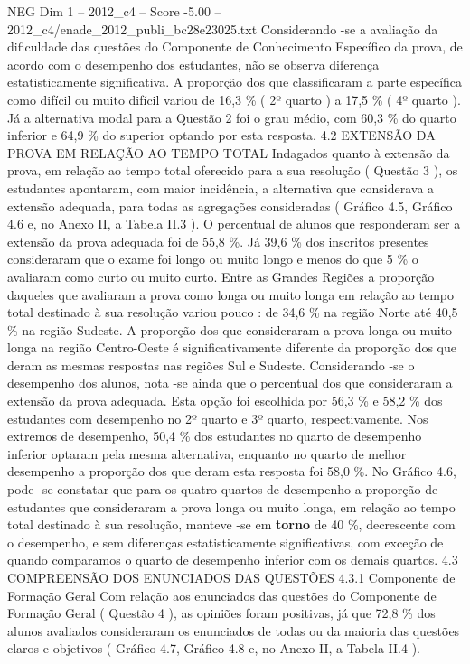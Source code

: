 \begin{textsample}{NEG Dim 1 – 2012\_c4 – Score -5.00 – 2012\_c4/enade\_2012\_publi\_bc28e23025.txt}
Considerando -se a avaliação da dificuldade das questões do Componente de Conhecimento Específico da prova, de acordo com o desempenho dos estudantes, não se observa diferença estatisticamente significativa.
A proporção dos que classificaram a parte específica como difícil ou muito difícil variou de 16,3 \% ( 2º quarto ) a 17,5 \% ( 4º quarto ).
Já a alternativa modal para a Questão 2 foi o grau médio, com 60,3 \% do quarto inferior e 64,9 \% do superior optando por esta resposta. 4.2 EXTENSÃO DA PROVA EM RELAÇÃO AO TEMPO TOTAL Indagados quanto à extensão da prova, em relação ao tempo total oferecido para a sua resolução ( Questão 3 ), os estudantes apontaram, com maior incidência, a alternativa que considerava a extensão adequada, para todas as agregações consideradas ( Gráfico 4.5, Gráfico 4.6 e, no Anexo II, a Tabela II.3 ).
O percentual de alunos que responderam ser a extensão da prova adequada foi de 55,8 \%.
Já 39,6 \% dos inscritos presentes consideraram que o exame foi longo ou muito longo e menos do que 5 \% o avaliaram como curto ou muito curto.
Entre as Grandes Regiões a proporção daqueles que avaliaram a prova como longa ou muito longa em relação ao tempo total destinado à sua resolução variou pouco : de 34,6 \% na região Norte até 40,5 \% na região Sudeste.
A proporção dos que consideraram a prova longa ou muito longa na região Centro-Oeste é significativamente diferente da proporção dos que deram as mesmas respostas nas regiões Sul e Sudeste.
Considerando -se o desempenho dos alunos, nota -se ainda que o percentual dos que consideraram a extensão da prova adequada.
Esta opção foi escolhida por 56,3 \% e 58,2 \% dos estudantes com desempenho no 2º quarto e 3º quarto, respectivamente.
Nos extremos de desempenho, 50,4 \% dos estudantes no quarto de desempenho inferior optaram pela mesma alternativa, enquanto no quarto de melhor desempenho a proporção dos que deram esta resposta foi 58,0 \%.
No Gráfico 4.6, pode -se constatar que para os quatro quartos de desempenho a proporção de estudantes que consideraram a prova longa ou muito longa, em relação ao tempo total destinado à sua resolução, manteve -se em \textbf{torno} de 40 \%, decrescente com o desempenho, e sem diferenças estatisticamente significativas, com exceção de quando comparamos o quarto de desempenho inferior com os demais quartos. 4.3 COMPREENSÃO DOS ENUNCIADOS DAS QUESTÕES 4.3.1 Componente de Formação Geral Com relação aos enunciados das questões do Componente de Formação Geral ( Questão 4 ), as opiniões foram positivas, já que 72,8 \% dos alunos avaliados consideraram os enunciados de todas ou da maioria das questões claros e objetivos ( Gráfico 4.7, Gráfico 4.8 e, no Anexo II, a Tabela II.4 ).

\end{textsample}
